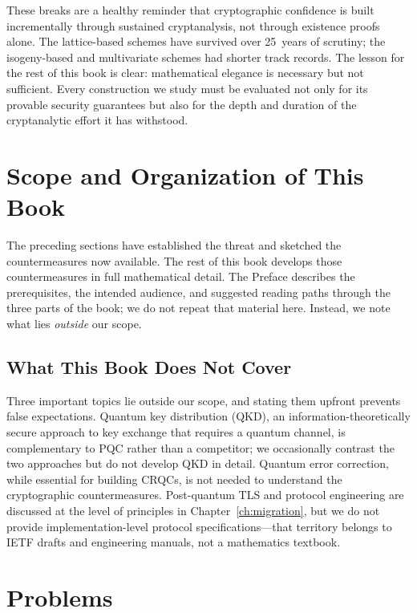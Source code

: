 These breaks are a healthy reminder that cryptographic confidence is built incrementally through sustained cryptanalysis, not through existence proofs alone.  The lattice-based schemes have survived over 25~years of scrutiny; the isogeny-based and multivariate schemes had shorter track records.  The lesson for the rest of this book is clear: mathematical elegance is necessary but not sufficient.  Every construction we study must be evaluated not only for its provable security guarantees but also for the depth and duration of the cryptanalytic effort it has withstood.


\section{Scope and Organization of This Book}
\label{sec:scope}

The preceding sections have established the threat and sketched the countermeasures now available.  The rest of this book develops those countermeasures in full mathematical detail.  The Preface describes the prerequisites, the intended audience, and suggested reading paths through the three parts of the book; we do not repeat that material here.  Instead, we note what lies \emph{outside} our scope.

\subsection{What This Book Does Not Cover}

Three important topics lie outside our scope, and stating them upfront prevents false expectations.  Quantum key distribution (QKD), an information-theoretically secure approach to key exchange that requires a quantum channel, is complementary to PQC rather than a competitor; we occasionally contrast the two approaches but do not develop QKD in detail.  Quantum error correction, while essential for building CRQCs, is not needed to understand the cryptographic countermeasures.  Post-quantum TLS and protocol engineering are discussed at the level of principles in Chapter~\ref{ch:migration}, but we do not provide implementation-level protocol specifications---that territory belongs to IETF drafts and engineering manuals, not a mathematics textbook.


\section*{Problems}

